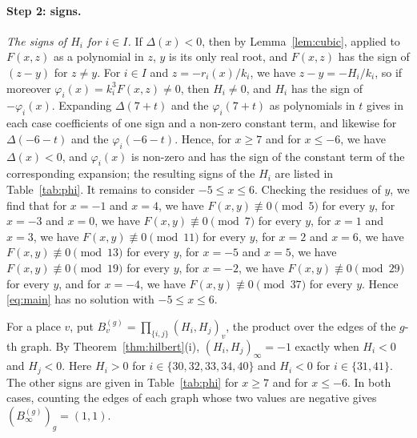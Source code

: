 \documentclass[11pt]{article}
\begin{document}
\paragraph{Step 2: signs.} \emph{The signs of $H_i$ for $i\in I$.} If $\Delta(x)<0$, then by Lemma~\ref{lem:cubic}, applied to $F(x,z)$ as a polynomial in $z$, $y$ is its only real root, and $F(x,z)$ has the sign of $(z-y)$ for $z\neq y$. For $i\in I$ and $z=-r_i(x)/k_i$, we have $z-y=-H_i/k_i$, so if moreover $\varphi_i(x)=k_i^3F(x,z)\neq0$, then $H_i\neq0$, and $H_i$ has the sign of $-\varphi_i(x)$. Expanding $\Delta(7+t)$ and the $\varphi_i(7+t)$ as polynomials in $t$ gives in each case coefficients of one sign and a non-zero constant term, and likewise for $\Delta(-6-t)$ and the $\varphi_i(-6-t)$. Hence, for $x\geq7$ and for $x\leq-6$, we have $\Delta(x)<0$, and $\varphi_i(x)$ is non-zero and has the sign of the constant term of the corresponding expansion; the resulting signs of the $H_i$ are listed in Table~\ref{tab:phi}. It remains to consider $-5\leq x\leq6$. Checking the residues of $y$, we find that for $x=-1$ and $x=4$, we have $F(x,y)\not\equiv0\pmod{5}$ for every $y$, for $x=-3$ and $x=0$, we have $F(x,y)\not\equiv0\pmod{7}$ for every $y$, for $x=1$ and $x=3$, we have $F(x,y)\not\equiv0\pmod{11}$ for every $y$, for $x=2$ and $x=6$, we have $F(x,y)\not\equiv0\pmod{13}$ for every $y$, for $x=-5$ and $x=5$, we have $F(x,y)\not\equiv0\pmod{19}$ for every $y$, for $x=-2$, we have $F(x,y)\not\equiv0\pmod{29}$ for every $y$, and for $x=-4$, we have $F(x,y)\not\equiv0\pmod{37}$ for every $y$. Hence \eqref{eq:main} has no solution with $-5\leq x\leq6$.

For a place $v$, put $B^{(g)}_v=\prod_{\{i,j\}}(H_i,H_j)_v$, the product over the edges of the $g$-th graph. By Theorem~\ref{thm:hilbert}(i), $(H_i,H_j)_\infty=-1$ exactly when $H_i<0$ and $H_j<0$. Here $H_i>0$ for $i\in\{30,\allowbreak 32,\allowbreak 33,\allowbreak 34,\allowbreak 40\}$ and $H_i<0$ for $i\in\{31,\allowbreak 41\}$. The other signs are given in Table~\ref{tab:phi} for $x\geq7$ and for $x\leq-6$. In both cases, counting the edges of each graph whose two values are negative gives $(B^{(g)}_\infty)_g=(1,1)$.
\end{document}
